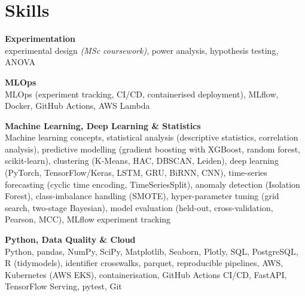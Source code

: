 \documentclass[a4paper,11pt]{article}
\newcommand{\skillgroup}[2]{{\color{headernavy}\textbf{#1}}\\ #2\par\vspace{3pt}}
\begin{document}
\section{Skills}
\skillgroup{Experimentation}{experimental design \textit{(MSc coursework)}, power analysis, hypothesis testing, ANOVA}
\skillgroup{MLOps}{MLOps (experiment tracking, CI/CD, containerised deployment), MLflow, Docker, GitHub Actions, AWS Lambda}
\skillgroup{Machine Learning, Deep Learning \& Statistics}{Machine learning concepts, statistical analysis (descriptive statistics, correlation analysis), predictive modelling (gradient boosting with XGBoost, random forest, scikit-learn), clustering (K-Means, HAC, DBSCAN, Leiden), deep learning (PyTorch, TensorFlow/Keras, LSTM, GRU, BiRNN, CNN), time-series forecasting (cyclic time encoding, TimeSeriesSplit), anomaly detection (Isolation Forest), class-imbalance handling (SMOTE), hyper-parameter tuning (grid search, two-stage Bayesian), model evaluation (held-out, cross-validation, Pearson, MCC), MLflow experiment tracking}
\skillgroup{Python, Data Quality \& Cloud}{Python, pandas, NumPy, SciPy, Matplotlib, Seaborn, Plotly, SQL, PostgreSQL, R (tidymodels), identifier crosswalks, parquet, reproducible pipelines, AWS, Kubernetes (AWS EKS), containerisation, GitHub Actions CI/CD, FastAPI, TensorFlow Serving, pytest, Git}
\end{document}
